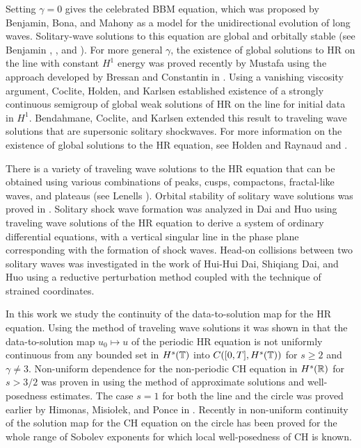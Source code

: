 Setting $\gamma = 0$ gives the celebrated 
BBM equation, which was proposed by 
Benjamin, Bona, and Mahony 
\cite{Benjamin_1972_Model-equations} as a model for 
the unidirectional evolution of long waves.
Solitary-wave solutions to this 
equation are global and orbitally stable (see Benjamin 
\cite{Benjamin_1972_The-stability-o}, 
\cite{Benjamin_1972_Model-equations}, and 
\cite{Constantin_2000_Stability-of-a-}).
For more general $\gamma$, the existence of global 
solutions to HR on the line with constant $H^1$ energy
was proved recently by Mustafa \cite{Mustafa:2007}
using the approach developed by Bressan and 
Constantin in \cite{Bressan_2007_Global-conserva}. Using a vanishing 
viscosity argument, Coclite, 
Holden, and Karlsen \cite{Coclite_2005_Global-weak-sol}
established existence of a strongly continuous semigroup of global 
weak solutions of HR on the line for initial data in $H^1$.
Bendahmane, Coclite, and Karlsen 
\cite{Bendahmane:2006p1301} extended this result to traveling 
wave solutions that are supersonic solitary shockwaves.
For more information on the existence of global solutions to the HR
equation, see Holden and Raynaud \cite{Holden_2007_Global-conserva}
and \cite{Yin_2003_On-the-Cauchy-p}. 

There is a variety of traveling wave solutions to the HR equation that can be 
obtained using various combinations of peaks, cusps, compactons, 
fractal-like waves, and plateaus (see Lenells 
\cite{Lenells_2006_Traveling-waves}). Orbital stability of solitary wave 
solutions was proved in \cite{Constantin_2000_Stability-of-a-}.
Solitary shock wave formation was 
analyzed in Dai and Huo \cite{Dai_2000_Solitary-shock-} using traveling 
wave solutions of the HR equation to derive a system of ordinary differential 
equations, with a vertical singular line in the phase plane corresponding with the 
formation of shock waves. Head-on collisions between two solitary 
waves was investigated in the work of Hui-Hui Dai, 
Shiqiang Dai, and Huo \cite{Dai_2000_Head-on-collisi} using a reductive 
perturbation method coupled with the technique of strained coordinates. 

In this work we study the continuity of the data-to-solution map for the HR 
equation.
Using the method of traveling wave solutions it was shown in  
\cite{Olson_2006_Non-uniform-dep} that the data-to-solution map
$u_0  \mapsto u$ of the periodic HR equation is not uniformly continuous 
from any bounded set in $H^s(\mathbb{T})$ into $C([0, T ], H^s(\mathbb{T}))$ for $s \ge 
2$ and $\gamma \neq 3$. Non-uniform dependence for the non-periodic CH 
equation in 
$H^s(\mathbb{R})$ for $s>3/2$ was proven in \cite{Himonas:2009fk} 
using the method of approximate solutions and well-posedness estimates. The 
case $s=1$ for both the line and the circle
was proved earlier by Himonas, Misio{\l}ek, and Ponce in 
\cite{Himonas_2007_Non-uniform-con}.
Recently in \cite{Himonas:2010} non-uniform 
continuity of the solution map for the CH equation
on the circle has been proved
for the whole range of Sobolev exponents for which local well-posedness of 
CH is known.


